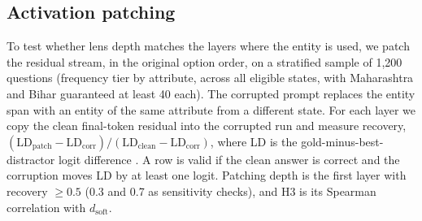 \subsection{Activation patching}

To test whether lens depth matches the layers where the entity is used, we patch the residual stream, in the original option order, on a stratified sample of 1{,}200 questions (frequency tier by attribute, across all eligible states, with Maharashtra and Bihar guaranteed at least 40 each).
The corrupted prompt replaces the entity span with an entity of the same attribute from a different state.
For each layer we copy the clean final-token residual into the corrupted run and measure recovery, $(\mathrm{LD}_{\mathrm{patch}} - \mathrm{LD}_{\mathrm{corr}}) / (\mathrm{LD}_{\mathrm{clean}} - \mathrm{LD}_{\mathrm{corr}})$, where LD is the gold-minus-best-distractor logit difference \citep{zhang2024patching}.
A row is valid if the clean answer is correct and the corruption moves LD by at least one logit.
Patching depth is the first layer with recovery $\geq 0.5$ (0.3 and 0.7 as sensitivity checks), and H3 is its Spearman correlation with $d_{\mathrm{soft}}$.
